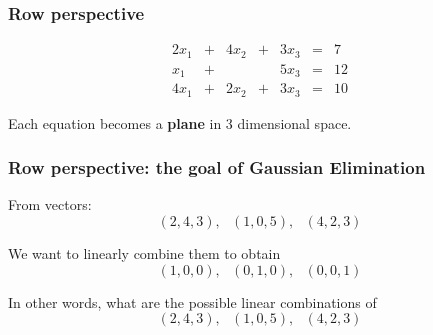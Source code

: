 \begin{frame}
  \frametitle{Row perspective}

  {\tiny
  \[
  \begin{array}{rcrcrcl}
    2x_1 & + & 4x_2 & + & 3x_3 & = & 7 \\
    x_1 & + &  &  & 5x_3 & = & 12 \\
    4x_1 & + & 2x_2 & + & 3x_3 & = & 10
  \end{array}
  \]
  }

  Each equation becomes a {\bf plane} in 3 dimensional space.

  \vspace{2.5in}
  
\end{frame}

\begin{frame}
  \frametitle{Row perspective: the goal of Gaussian Elimination}

  From vectors:
  \[
  (2,4,3), \ \ \ (1,0,5), \ \ \ (4,2,3)
  \]

  We want to linearly combine them to obtain
  \[
  (1,0,0), \ \ \ (0,1,0), \ \ \ (0,0,1)
  \]

  \pause

  In other words,
  what are the possible linear combinations of 
  \[
  (2,4,3), \ \ \ (1,0,5), \ \ \ (4,2,3)
  \]

\end{frame}


